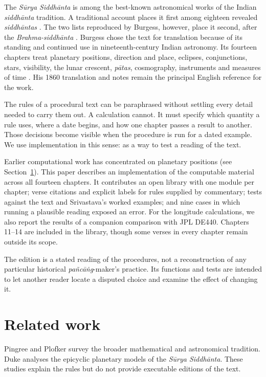 \documentclass[11pt,a4paper]{article}
\begin{document}
The \textit{S\={u}rya Siddh\={a}nta} is among the best-known astronomical works of the Indian \textit{siddh\={a}nta} tradition. A traditional account places it first among eighteen revealed \textit{siddh\={a}ntas} \citep{sengupta1935}. The two lists reproduced by Burgess, however, place it second, after the \textit{Brahma-siddh\={a}nta} \citep[Appendix, note to p.~ii]{burgess1860}. Burgess chose the text for translation because of its standing and continued use in nineteenth-century Indian astronomy. Its fourteen chapters treat planetary positions, direction and place, eclipses, conjunctions, stars, visibility, the lunar crescent, \textit{p\={a}tas}, cosmography, instruments and measures of time \citep{burgess1860,pingree1978,plofker2009}. His 1860 translation and notes remain the principal English reference for the work.

The rules of a procedural text can be paraphrased without settling every detail needed to carry them out. A calculation cannot. It must specify which quantity a rule uses, where a date begins, and how one chapter passes a result to another. Those decisions become visible when the procedure is run for a dated example. We use implementation in this sense: as a way to test a reading of the text.

Earlier computational work has concentrated on planetary positions (see Section~\ref{sec:related}). This paper describes an implementation of the computable material across all fourteen chapters. It contributes an open library with one module per chapter; verse citations and explicit labels for rules supplied by commentary; tests against the text and Srivastava's worked examples; and nine cases in which running a plausible reading exposed an error. For the longitude calculations, we also report the results of a companion comparison with JPL DE440. Chapters 11--14 are included in the library, though some verses in every chapter remain outside its scope.

The edition is a stated reading of the procedures, not a reconstruction of any particular historical \textit{pa\~{n}c\={a}\.{n}g}-maker's practice. Its functions and tests are intended to let another reader locate a disputed choice and examine the effect of changing it.

\section{Related work}
\label{sec:related}

Pingree \citep{pingree1978} and Plofker \citep{plofker2009} survey the broader mathematical and astronomical tradition. Duke \citep{duke2005} analyses the epicyclic planetary models of the \textit{S\={u}rya Siddh\={a}nta}. These studies explain the rules but do not provide executable editions of the text.
\end{document}
